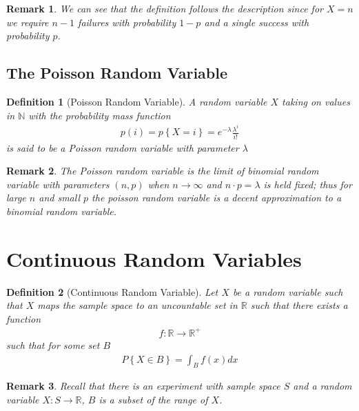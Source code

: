\documentclass[11pt, oneside]{book}   	%
\newtheorem{definition}{Definition}[chapter]
\newtheorem{remark}{Remark}[chapter]
\begin{document}
\begin{spacing}{1.618}
\begin{remark}
	We can see that the definition follows the description since for $X=n$ we require $n-1$ failures with probability $1-p$ and a single success with probability $p$. 
\end{remark}

\subsection{The Poisson Random Variable}

\begin{definition}[Poisson Random Variable]
	A random variable $X$ taking on values in $\mathbb{N}$ with the probability mass function 
	\begin{alignat}{4}
		p(i)=p\left\{X=i\right\} = e^{-\lambda}\frac{\lambda^i}{i!}
	\end{alignat}
	is said to be a Poisson random variable with parameter $\lambda$
\end{definition}

\begin{remark}
	The Poisson random variable is the limit of binomial random variable with parameters $(n, p)$ when $n\to\infty$ and $n\cdot p=\lambda$ is held fixed; thus for large $n$ and small $p$ the poisson random variable is a decent approximation to a binomial random variable. 
\end{remark}

\section{Continuous Random Variables}

\begin{definition}[Continuous Random Variable]
	Let $X$ be a random variable such that $X$ maps the sample space to an uncountable set in $\mathbb{R}$ such that there exists a function
	\begin{alignat}{4}
		f:\mathbb{R}\to\mathbb{R}^+
	\end{alignat}
	such that for some set $B$ 
	\begin{alignat}{4}
		P\left\{X\in B\right\} = \int_{B}f(x)dx
	\end{alignat}
\end{definition}

\begin{remark}
	Recall that there is an experiment with sample space $S$ and a random variable $X:S\to\mathbb{R}$, $B$ is a subset of the range of $X$. 
\end{remark}


\end{spacing}
\end{document}
